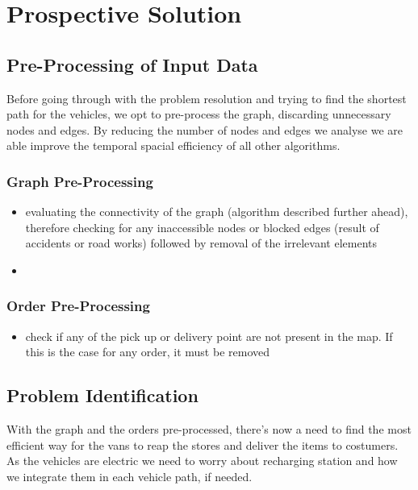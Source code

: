 \chapter{Prospective Solution}


\section{Pre-Processing of Input Data}
Before going through with the problem resolution and trying to find the shortest path for the vehicles, we opt to pre-process the graph, discarding unnecessary nodes and edges. By reducing the number of nodes and edges we analyse we are able improve the temporal spacial efficiency of all other algorithms. 

\subsection{Graph Pre-Processing}
\begin{itemize}
    \item evaluating the connectivity of the graph (algorithm described further ahead), therefore checking for any inaccessible nodes or blocked edges (result of accidents or road works) followed by removal of the irrelevant elements
    \item 
\end{itemize}

\subsection{Order Pre-Processing}
\begin{itemize}
    \item check if any of the pick up or delivery point are not present in the map. If this is the case for any order, it must be removed
\end{itemize}


\section{Problem Identification}
With the graph and the orders pre-processed, there's now a need to find the most efficient way for the vans to reap the stores and deliver the items to costumers. As the vehicles are electric we need to worry about recharging station and how we integrate them in each vehicle path, if needed.


